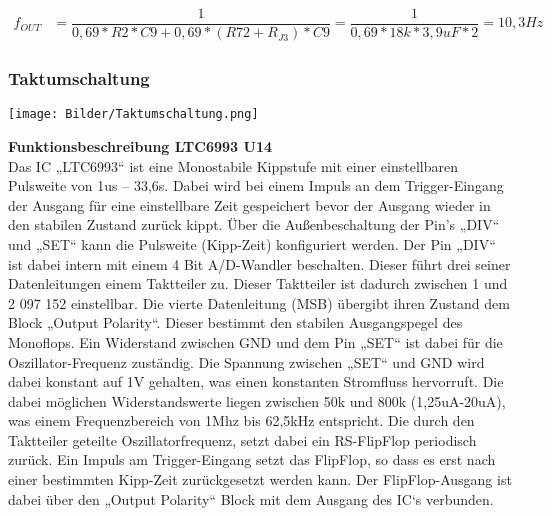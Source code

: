 \documentclass[a4paper,11pt]{scrartcl}
\begin{document}
\begin{center}
\begin{align}
	f_{OUT} &= \dfrac{1}{0,69*R2*C9 + 0,69*(R72+R_{J3})* C9} = \dfrac{1}{0,69*18k*3,9uF*2} = 10,3Hz
\end{align} 
\end{center}

\newpage
\subsubsection{Taktumschaltung}

\begin{center}
\texttt{[image: Bilder/Taktumschaltung.png]}
\end{center}


\textbf{Funktionsbeschreibung LTC6993 U14}
\\
Das IC „LTC6993“ ist eine Monostabile Kippstufe mit einer einstellbaren Pulsweite von 1us – 33,6s. Dabei wird bei einem Impuls an dem Trigger-Eingang der Ausgang für eine einstellbare Zeit gespeichert bevor der Ausgang wieder in den stabilen Zustand zurück kippt. Über die Außenbeschaltung der Pin’s „DIV“ und „SET“ kann die Pulsweite (Kipp-Zeit) konfiguriert werden. Der Pin „DIV“ ist dabei intern mit einem 4 Bit A/D-Wandler beschalten. Dieser führt drei seiner Datenleitungen einem Taktteiler zu. Dieser Taktteiler ist dadurch zwischen 1 und 2 097 152 einstellbar. Die vierte Datenleitung (MSB) übergibt ihren Zustand dem Block „Output Polarity“. Dieser bestimmt den stabilen Ausgangspegel des Monoflops. Ein Widerstand zwischen GND und dem Pin „SET“ ist dabei für die Oszillator-Frequenz zuständig. Die Spannung zwischen „SET“ und GND wird dabei konstant auf 1V gehalten, was einen konstanten Stromfluss hervorruft. Die dabei möglichen Widerstandswerte liegen zwischen 50k und 800k (1,25uA-20uA), was einem Frequenzbereich von 1Mhz bis 62,5kHz entspricht. Die durch den Taktteiler geteilte Oszillatorfrequenz, setzt dabei ein RS-FlipFlop periodisch zurück. Ein Impuls am Trigger-Eingang setzt das FlipFlop, so dass es erst nach einer bestimmten Kipp-Zeit zurückgesetzt werden kann. Der FlipFlop-Ausgang ist dabei über den „Output Polarity“ Block mit dem Ausgang des IC‘s verbunden.

\newpage
\end{document}
